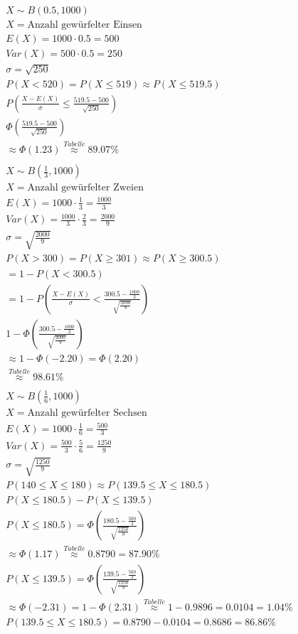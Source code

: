 \begin{align*}
    X \sim B(0.5, 1000) \\
    X = \text{Anzahl gewürfelter Einsen} \\
    E(X) = 1000 \cdot 0.5 = 500 \\
    Var(X) = 500 \cdot 0.5 = 250 \\
    \sigma = \sqrt{250} \\
    P(X < 520) = P(X \leq 519) \approx P(X \leq 519.5) \\
    P\left(\frac{X - E(X)}{\sigma} \leq \frac{519.5 - 500}{\sqrt{250}}\right) \\
    \Phi\left(\frac{519.5 - 500}{\sqrt{250}}\right) \\
    \approx \Phi(1.23) \overset{Tabelle}{\approx} 89.07\% \\\\
    X \sim B(\frac{1}{3}, 1000) \\
    X = \text{Anzahl gewürfelter Zweien} \\
    E(X) = 1000 \cdot \frac{1}{3} = \frac{1000}{3} \\
    Var(X) = \frac{1000}{3} \cdot \frac{2}{3} = \frac{2000}{9} \\
    \sigma = \sqrt{\frac{2000}{9}} \\
    P(X > 300) = P(X \geq 301) \approx P(X \geq 300.5) \\
    = 1 - P(X < 300.5) \\
    = 1 - P\left(\frac{X - E(X)}{\sigma} < \frac{300.5 - \frac{1000}{3}}{\sqrt{\frac{2000}{9}}}\right) \\
    1 - \Phi\left(\frac{300.5 - \frac{1000}{3}}{\sqrt{\frac{2000}{9}}}\right) \\
    \approx 1 - \Phi(-2.20) = \Phi(2.20) \\
    \overset{Tabelle}{\approx} 98.61\% \\\\
    X \sim B(\frac{1}{6}, 1000) \\
    X = \text{Anzahl gewürfelter Sechsen} \\
    E(X) = 1000 \cdot \frac{1}{6} = \frac{500}{3} \\
    Var(X) = \frac{500}{3} \cdot \frac{5}{6} = \frac{1250}{9} \\
    \sigma = \sqrt{\frac{1250}{9}} \\
    P(140 \leq X \leq 180) \approx P(139.5 \leq X \leq 180.5) \\
    P(X \leq 180.5) - P(X \leq 139.5) \\
    P(X \leq 180.5) = \Phi\left(\frac{180.5 - \frac{500}{3}}{\sqrt{\frac{1250}{9}}}\right) \\
    \approx \Phi(1.17) \overset{Tabelle}{\approx} 0.8790 = 87.90\%\\
    P(X \leq 139.5) = \Phi\left(\frac{139.5 - \frac{500}{3}}{\sqrt{\frac{1250}{9}}}\right) \\
    \approx \Phi(-2.31) = 1 - \Phi(2.31) \overset{Tabelle}{\approx} 1 - 0.9896 = 0.0104 = 1.04\% \\
    P(139.5 \leq X \leq 180.5) = 0.8790 - 0.0104 = 0.8686 = 86.86\%
\end{align*}

